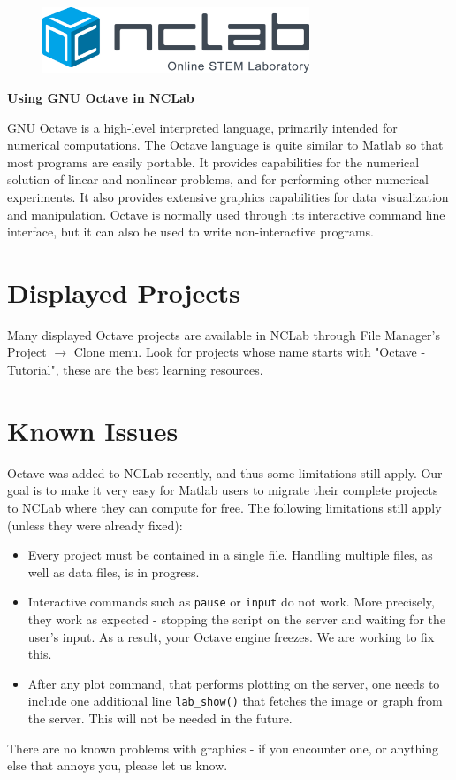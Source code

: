 \documentclass{article}
\begin{document}
\large

\vbox{}
\begin{figure}[!ht]
\includegraphics[width=8cm]{logo.png}
\vspace{4mm}
\end{figure}

\centerline{\huge \bf Using GNU Octave in NCLab}
\vspace{6mm}
\noindent
GNU Octave is a high-level interpreted language, primarily intended for numerical computations. The Octave language is quite similar to Matlab so that most programs are easily portable. It provides capabilities for the numerical solution of linear and nonlinear problems, and for performing other numerical experiments. It also provides extensive graphics capabilities for data visualization and manipulation. Octave is normally used through its interactive command line interface, but it can also be used to write non-interactive programs. 

\section*{Displayed Projects}

Many displayed Octave projects are available in NCLab through File Manager's Project $\rightarrow$ Clone 
menu. Look for projects whose name starts with "Octave - Tutorial", these are the best learning 
resources.

\section*{Known Issues}

Octave was added to NCLab recently, and thus some limitations still apply. Our goal is to make 
it very easy for Matlab users to migrate their complete projects to NCLab where they can 
compute for free. The following limitations still apply (unless they were already fixed):

\begin{itemize}
\item Every project must be contained in a single file. Handling multiple files, as well as
      data files, is in progress. 
\item Interactive commands such as {\tt pause} or {\tt input} do not work. More precisely,
      they work as expected - stopping the script on the server and waiting for the user's
      input. As a result, your Octave engine freezes. We are working to fix this. 
\item After any plot command, that performs plotting on the server, one needs to include 
      one additional line {\tt lab\_show()} that fetches the image or graph from the server. 
      This will not be needed in the future.  
\end{itemize}
There are no known problems with graphics - if you encounter one, or anything else that annoys
you, please let us know.
\end{document}
